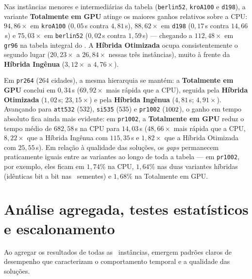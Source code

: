Nas instâncias menores e intermediárias da tabela (\texttt{berlin52}, \texttt{kroA100} e \texttt{d198}), a variante \textbf{Totalmente em GPU} atinge os maiores ganhos relativos sobre a CPU: \(94{,}86\times\) em \texttt{kroA100} (\(0{,}05\)\,s contra \(4{,}81\)\,s), \(88{,}62\times\) em \texttt{d198} (\(0{,}17\)\,s contra \(14{,}66\)\,s) e \(75{,}03\times\) em \texttt{berlin52} (\(0{,}02\)\,s contra \(1{,}59\)\,s) --- chegando a \(112{,}48\times\) em \texttt{gr96} na tabela integral do .
A \textbf{Híbrida Otimizada} ocupa consistentemente o segundo lugar (\(20{,}23\times\) a \(26{,}84\times\) nessas três instâncias), muito à frente da \textbf{Híbrida Ingênua} (\(3{,}12\times\) a \(4{,}76\times\)).

Em \texttt{pr264} (\(264\) cidades), a mesma hierarquia se mantém: a \textbf{Totalmente em GPU} conclui em \(0{,}34\)\,s (\(69{,}92\times\) mais rápida que a CPU), seguida pela \textbf{Híbrida Otimizada} (\(1{,}02\)\,s; \(23{,}15\times\)) e pela \textbf{Híbrida Ingênua} (\(4{,}81\)\,s; \(4{,}91\times\)).
Avançando para \texttt{att532} (\(532\)), \texttt{si535} (\(535\)) e \texttt{pr1002} (\(1002\)), o ganho em tempo absoluto fica ainda mais evidente: em \texttt{pr1002}, a \textbf{Totalmente em GPU} reduz o tempo médio de \(682{,}58\)\,s na CPU para \(14{,}03\)\,s (\(48{,}66\times\) mais rápida que a CPU, \(8{,}22\times\) que a Híbrida Ingênua com \(115{,}35\)\,s e \(1{,}82\times\) que a Híbrida Otimizada com \(25{,}55\)\,s).
Em relação à qualidade das soluções, os \emph{gaps} permanecem praticamente iguais entre as variantes ao longo de toda a tabela --- em \texttt{pr1002}, por exemplo, eles ficam em \(1{,}74\%\) na CPU, \(1{,}64\%\) nas duas variantes híbridas (idênticas bit a bit nas \totalrepeticoes\ sementes) e \(1{,}68\%\) na Totalmente em GPU.

\section{Análise agregada, testes estatísticos e escalonamento}\label{sec-43-analise-agregada}

Ao agregar os resultados de todas as \totalinstancias\ instâncias, emergem padrões claros de desempenho que caracterizam o comportamento temporal e a qualidade das soluções.

